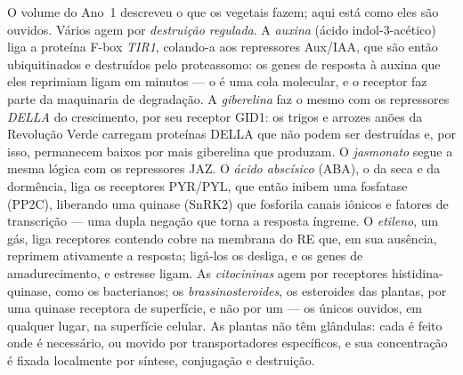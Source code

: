 \begin{definition}\label{def:b3:plant-molecular-physiology:hormones}
O volume do Ano~1 descreveu o que os  vegetais fazem; aqui está
como eles são ouvidos. Vários agem por \emph{destruição regulada}. A
\emph{auxina} (ácido indol-3-acético) liga a proteína F-box \emph{TIR1},
colando-a aos repressores Aux/IAA, que são então ubiquitinados e
destruídos pelo proteassomo: os genes de resposta à auxina que eles
reprimiam ligam em minutos --- o  é uma cola molecular, e o
receptor faz parte da maquinaria de degradação. A \emph{giberelina} faz o
mesmo com os repressores \emph{DELLA} do crescimento, por seu receptor
GID1: os trigos e arrozes anões da Revolução Verde carregam proteínas
DELLA que não podem ser destruídas e, por isso, permanecem baixos por
mais giberelina que produzam. O \emph{jasmonato} segue a mesma lógica com
os repressores JAZ. O \emph{ácido abscísico} (ABA), o  da seca e
da dormência, liga os receptores PYR/PYL, que então inibem uma fosfatase
(PP2C), liberando uma quinase (SnRK2) que fosforila canais iônicos e
fatores de transcrição --- uma dupla negação que torna a resposta
íngreme. O \emph{etileno}, um gás, liga receptores contendo cobre na
membrana do RE que, em sua ausência, reprimem ativamente a resposta;
ligá-los os desliga, e os genes de amadurecimento,  e estresse
ligam. As \emph{citocininas} agem por receptores histidina-quinase, como
os  bacterianos; os \emph{brassinosteroides},
os esteroides das plantas, por uma quinase receptora de superfície, e não
por um  --- os únicos  ouvidos, em
qualquer lugar, na superfície celular. As plantas não têm glândulas: cada
 é feito onde é necessário, ou movido por transportadores
específicos, e sua concentração é fixada localmente por síntese,
conjugação e destruição.
\end{definition}

